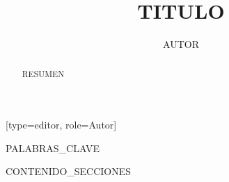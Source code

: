 \documentclass[letterpaper,fleqn]{ciep-dc}
\begin{document}
\let\WriteBookmarks\relax
\def\floatpagepagefraction{1}
\def\textpagefraction{.001}


\title[mode=title]{{{TITULO}}}

\author[1]{{{AUTOR}}}[type=editor, role=Autor]
\fnmark[1]


\address[1]{{{INSTITUCION}}}

\begin{abstract}
{{RESUMEN}}
\end{abstract}

\begin{keywords}
{{PALABRAS_CLAVE}}
\end{keywords}

\maketitle

%   

{{CONTENIDO_SECCIONES}}

\renewcommand{\refname}{Bibliografía}


\end{document}
